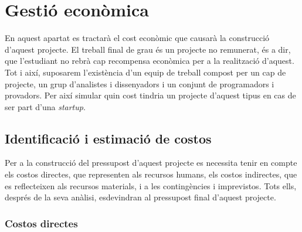 
\chapter{Gestió econòmica} %

\label{Chapter10} %

En aquest apartat es tractarà el cost econòmic que causarà la construcció d'aquest projecte. El treball final de grau és un projecte no remunerat, és a dir, que l'estudiant no rebrà cap recompensa econòmica per a la realització d'aquest. Tot i així, suposarem l'existència d'un equip de treball compost per un cap de projecte, un grup d'analistes i dissenyadors i un conjunt de programadors i provadors. Per així simular quin cost tindria un projecte d'aquest tipus en cas de ser part d'una \textit{startup}.


\section{Identificació i estimació de costos}

Per a la construcció del pressupost\cite{presupuesto} d'aquest projecte es necessita tenir en compte els costos directes, que representen als recursos humans, els costos indirectes, que es reflecteixen als recursos materials, i a les contingències i imprevistos. Tots ells, després de la seva anàlisi, esdevindran al pressupost final d'aquest projecte.

\subsection{Costos directes}

